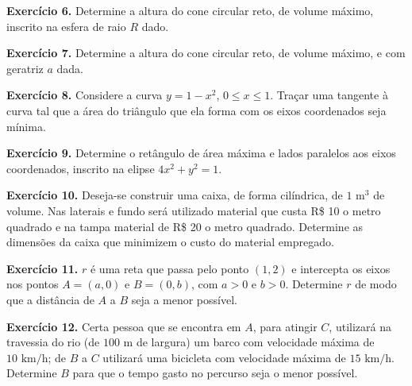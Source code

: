 \documentclass[12pt,a4paper]{article}
\begin{document}
\vspace{0.5cm}
\noindent\textbf{Exercício 6.} Determine a altura do cone circular reto, de volume máximo, inscrito na esfera de raio $R$ dado.

\vspace{0.5cm}
\noindent\textbf{Exercício 7.} Determine a altura do cone circular reto, de volume máximo, e com geratriz $a$ dada.

\vspace{0.5cm}
\noindent\textbf{Exercício 8.} Considere a curva $y = 1 - x^2$, $0 \le x \le 1$. Traçar uma tangente à curva tal que a área do triângulo que ela forma com os eixos coordenados seja mínima.

\vspace{0.5cm}
\noindent\textbf{Exercício 9.} Determine o retângulo de área máxima e lados paralelos aos eixos coordenados, inscrito na elipse $4x^2 + y^2 = 1$.

\vspace{0.5cm}
\noindent\textbf{Exercício 10.} Deseja-se construir uma caixa, de forma cilíndrica, de $1\text{ m}^3$ de volume. Nas laterais e fundo será utilizado material que custa R\$ 10 o metro quadrado e na tampa material de R\$ 20 o metro quadrado. Determine as dimensões da caixa que minimizem o custo do material empregado.

\vspace{0.5cm}
\noindent\textbf{Exercício 11.} $r$ é uma reta que passa pelo ponto $(1, 2)$ e intercepta os eixos nos pontos $A = (a, 0)$ e $B = (0, b)$, com $a > 0$ e $b > 0$. Determine $r$ de modo que a distância de $A$ a $B$ seja a menor possível.

\vspace{0.5cm}
\noindent\textbf{Exercício 12.} Certa pessoa que se encontra em $A$, para atingir $C$, utilizará na travessia do rio (de $100\text{ m}$ de largura) um barco com velocidade máxima de $10\text{ km/h}$; de $B$ a $C$ utilizará uma bicicleta com velocidade máxima de $15\text{ km/h}$. Determine $B$ para que o tempo gasto no percurso seja o menor possível.
\end{document}
